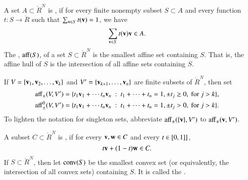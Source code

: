 \begin{definition}
A set $A\subset\ring{R}^N$ is , if for
every finite nonempty subset $S\subset A$ and every function $t:S\to\ring{R}$ such that $\sum _{{\mathbf v}\in S} t({\mathbf v})=1$, we have
\begin{displaymath}
 \sum_{\v\in S} t(\v) \v \in A.  %
\end{displaymath}
The , ${\operatorname{aff}}(S)$, of a set $S\subset\ring{R}^N$ is the smallest affine set
containing $S$. 
That is, the affine hull of $S$ is the intersection of all affine
sets containing $S$. 
\end{definition}


\begin{definition}[affine]\label{def:aff} 
  If $V = \{{\mathbf v}_1,{\mathbf v}_2,\ldots,{\mathbf v}_k\}$ and $V'=\{{\mathbf v}_{k+1},\ldots,{\mathbf v}_n\}$
  are finite subsets of $\ring{R}^N$, then set
	\begin{align*}
{\operatorname{aff}}_{\pm} (V,V') &= \{t_1 {\mathbf v}_1 +\cdots t_n {\mathbf v}_n \ :\ 
	t_1 +\cdots+t_n = 1, \pm t_j \ge 0, \text{ for } j>k\},\\
{\operatorname{aff}}^0_{\pm} (V,V') &= \{t_1 {\mathbf v}_1 +\cdots t_n {\mathbf v}_n \ :\ 
	t_1 +\cdots+t_n = 1, \pm t_j > 0, \text{ for } j>k\}.
		\end{align*}
To lighten the notation for singleton sets, abbreviate
${\operatorname{aff}}_\pm(\{{\mathbf v}\},V')$ to ${\operatorname{aff}}_\pm({\mathbf v},V')$.
%
%
%
%
%
\end{definition}



\begin{definition}
A subset $C\subset\ring{R}^N$ is , if for
every ${\mathbf v},{\mathbf w}\in C$ and every $t \in [0,1]]$,
\begin{displaymath}
t {\mathbf v} + (1-t) {\mathbf w} \in C.
\end{displaymath}
If $S\subset\ring{R}^N$, then let ${\operatorname{conv}}(S)$ be the smallest convex set
(or equivalently, the intersection of all convex sets)
containing $S$.  It is called the .
\end{definition}

